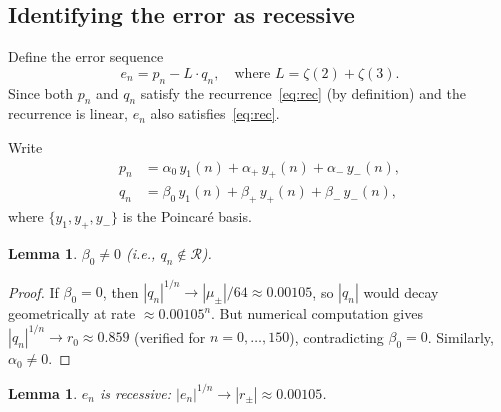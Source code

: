 \documentclass[11pt]{article}
\newtheorem{lemma}[theorem]{Lemma}
\theoremstyle{remark}
\begin{document}
\subsection{Identifying the error as recessive}

Define the error sequence
\begin{equation}\label{eq:error}
e_n = p_n - L \cdot q_n,
\quad \text{where } L = \zeta(2) + \zeta(3).
\end{equation}
Since both $p_n$ and $q_n$ satisfy the recurrence~\eqref{eq:rec}
(by definition) and the recurrence is linear, $e_n$ also
satisfies~\eqref{eq:rec}.

Write
\begin{align*}
p_n &= \alpha_0\, y_1(n) + \alpha_+\, y_+(n) + \alpha_-\, y_-(n), \\
q_n &= \beta_0\, y_1(n) + \beta_+\, y_+(n) + \beta_-\, y_-(n),
\end{align*}
where $\{y_1, y_+, y_-\}$ is the Poincar\'e basis.

\begin{lemma}\label{lem:dominant}
$\beta_0 \neq 0$ (i.e., $q_n \notin \mathcal{R}$).
\end{lemma}

\begin{proof}
If $\beta_0 = 0$, then $|q_n|^{1/n} \to |\mu_\pm|/64 \approx
0.00105$, so $|q_n|$ would decay geometrically at rate
$\approx 0.00105^n$. But numerical computation gives
$|q_n|^{1/n} \to r_0 \approx 0.859$ (verified for
$n = 0, \ldots, 150$), contradicting $\beta_0 = 0$.
Similarly, $\alpha_0 \neq 0$.
\end{proof}

\begin{lemma}\label{lem:recessive}
$e_n$ is recessive: $|e_n|^{1/n} \to |r_\pm| \approx 0.00105$.
\end{lemma}
\end{document}
